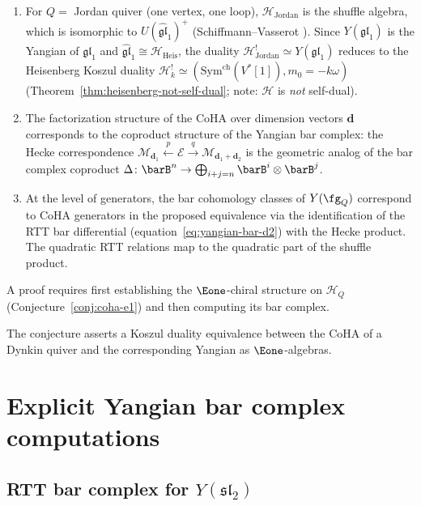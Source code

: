 \begin{remark}[Scope]
\begin{enumerate}[label=(\roman*)]
\item For $Q = $ Jordan quiver (one vertex, one loop),
$\mathcal{H}_{\mathrm{Jordan}}$ is the shuffle algebra, which
is isomorphic to $U(\widehat{\mathfrak{gl}}_1)^+$
(Schiffmann--Vasserot \cite{SV13}). Since $Y(\mathfrak{gl}_1)$
is the Yangian of $\mathfrak{gl}_1$ and
$\widehat{\mathfrak{gl}}_1 \cong \mathcal{H}_{\mathrm{Heis}}$,
the duality $\mathcal{H}_{\mathrm{Jordan}}^! \simeq Y(\mathfrak{gl}_1)$
reduces to the Heisenberg Koszul duality
$\mathcal{H}_k^!\simeq
(\mathrm{Sym}^{\mathrm{ch}}(V^*[1]),m_0=-k\omega)$
(Theorem~\ref{thm:heisenberg-not-self-dual}; note:
$\mathcal{H}$ is \emph{not} self-dual).
\item The factorization structure of the CoHA over dimension vectors
$\mathbf{d}$ corresponds to the coproduct structure of the Yangian bar
complex: the Hecke correspondence $\mathcal{M}_{\mathbf{d}_1}
\xleftarrow{p} \mathcal{E} \xrightarrow{q}
\mathcal{M}_{\mathbf{d}_1 + \mathbf{d}_2}$ is the geometric analog
of the bar complex coproduct $\Delta\colon \barB^n \to
\bigoplus_{i+j=n} \barB^i \otimes \barB^j$.
\item At the level of generators, the bar cohomology classes of
$Y(\fg_Q)$ correspond to CoHA generators in the proposed equivalence via the identification
of the RTT bar differential (equation~\eqref{eq:yangian-bar-d2}) with
the Hecke product. The quadratic RTT relations map to the quadratic
part of the shuffle product.
\end{enumerate}
A proof requires first establishing the $\Eone$-chiral structure
on $\mathcal{H}_Q$ (Conjecture~\ref{conj:coha-e1}) and then computing
its bar complex.

The conjecture asserts a Koszul duality equivalence between the CoHA of a Dynkin quiver and the corresponding Yangian as $\Eone$-algebras.
\end{remark}


\section{Explicit Yangian bar complex computations}
\label{sec:yangian-bar-explicit}

\subsection{\texorpdfstring{RTT bar complex for $Y(\mathfrak{sl}_2)$}{RTT bar complex for Y(sl2)}}

